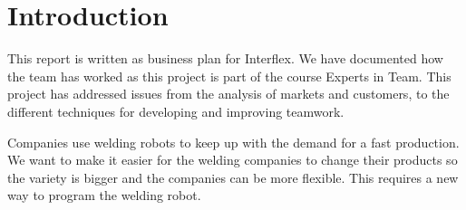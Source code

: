 \section{Introduction}

This report is written as business plan for Interflex. 
We have documented how the team has worked as this project is part of the course Experts in Team.
This project has addressed issues from the analysis of markets and customers, to the different techniques for developing and improving teamwork.

Companies use welding robots to keep up with the demand for a fast production.
We want to make it easier for the welding companies to change their products so the variety is bigger and the companies can be more flexible.
This requires a new way to program the welding robot. 
